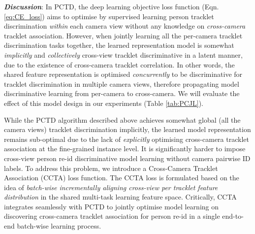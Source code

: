 \documentclass[runningheads]{llncs}
\begin{document}
\textbf{\em Discussion}: 
In PCTD, the deep learning objective loss function
(Eqn. \eqref{eq:CE_loss}) aims to optimise by supervised learning
person tracklet discrimination {\em within} each camera view without
any knowledge on {\em cross-camera} tracklet association. 
However, when jointly learning all the per-camera tracklet
discrimination tasks together, the learned representation model is
somewhat {\em implicitly} and {\em collectively} cross-view
tracklet discriminative in a latent manner, due to the existence of cross-camera tracklet
correlation.
In other words,
the shared feature representation is optimised {\em concurrently} to
be discriminative for tracklet discrimination in multiple camera
views, therefore propagating model discriminative learning from per-camera
to cross-camera. We will evaluate the effect of this model design in
our experiments (Table \ref{tab:PCJL}).


While the PCTD algorithm described above 
achieves somewhat global (all the camera views) tracklet discrimination implicitly, the learned
model representation remains sub-optimal due to the lack of {\em
  explicitly} optimising cross-camera tracklet association at the
fine-grained instance level.
It is significantly harder to impose cross-view person re-id
discriminative model learning without camera pairwise ID labels.
To address this problem,
we introduce a Cross-Camera Tracklet Association (CCTA) loss function.
The CCTA loss is formulated based on the idea of 
{\em batch-wise incrementally aligning cross-view per tracklet feature
  distribution} in the shared multi-task learning feature
space. 
Critically, CCTA integrates seamlessly with PCTD to jointly optimise
model learning on discovering cross-camera tracklet association for
person re-id in a single end-to-end batch-wise learning process.
\end{document}
